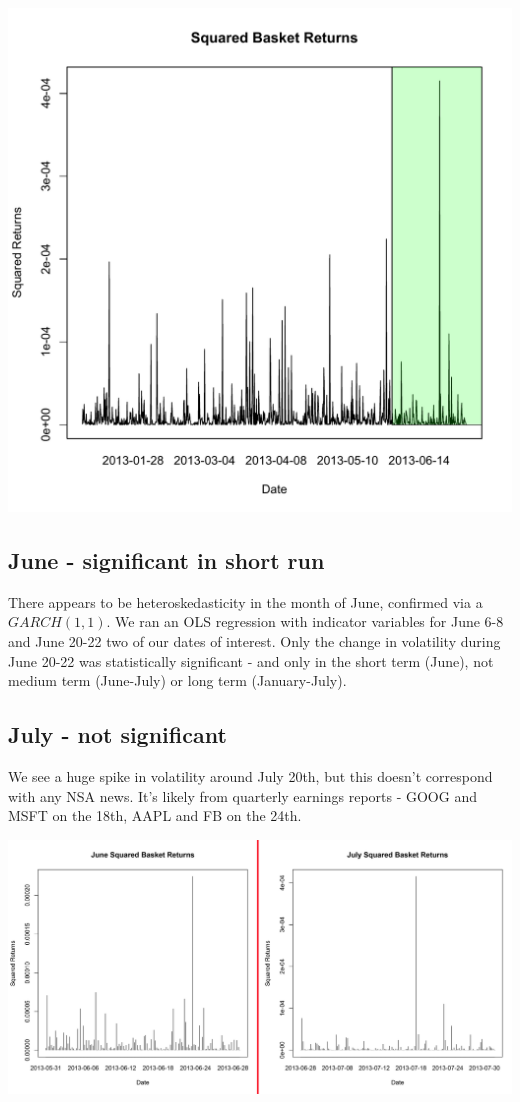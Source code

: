 \documentclass[10pt]{amsart}
\begin{document}
\centerline{\includegraphics[scale=0.45]{basket_sq_returns_12_08.pdf}}

\subsection{June - significant in short run}
There appears to be heteroskedasticity in the month of June, confirmed via a $GARCH(1,1)$. We ran an OLS regression with indicator variables for June 6-8 and June 20-22 two of our dates of interest. Only the change in volatility during June 20-22 was statistically significant - and only in the short term (June), not medium term (June-July) or long term (January-July).

\newpage

\subsection{July - not significant}
We see a huge spike in volatility around July 20th, but this doesn't correspond with any NSA news. It's likely from quarterly earnings reports - GOOG and MSFT on the 18th, AAPL and FB on the 24th.

\centerline{\includegraphics[scale=0.7]{june+july_squared_ret.pdf}}
\end{document}
